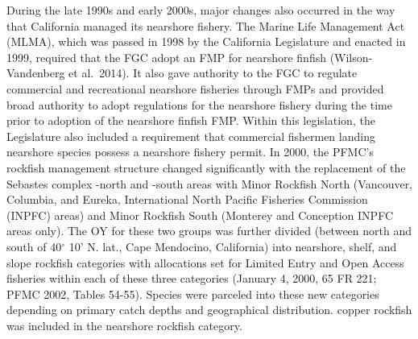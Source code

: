 \documentclass[11pt,
  english,
  letterpaper,
]{article}
\begin{document}
During the late 1990s and early 2000s, major changes also occurred in the way that California managed its nearshore fishery. The Marine Life Management Act (MLMA), which was passed in 1998 by the California Legislature and enacted in 1999, required that the FGC adopt an FMP for nearshore finfish (Wilson-Vandenberg et al.~2014). It also gave authority to the FGC to regulate commercial and recreational nearshore fisheries through FMPs and provided broad authority to adopt regulations for the nearshore fishery during the time prior to adoption of the nearshore finfish FMP. Within this legislation, the Legislature also included a requirement that commercial fishermen landing nearshore species possess a nearshore fishery permit. In 2000, the PFMC's rockfish management structure changed significantly with the replacement of the Sebastes complex -north and -south areas with Minor Rockfish North (Vancouver, Columbia, and Eureka, International North Pacific Fisheries Commission (INPFC) areas) and Minor Rockfish South (Monterey and Conception INPFC areas only). The OY for these two groups was further divided (between north and south of 40\(^\circ\) 10' N. lat., Cape Mendocino, California) into nearshore, shelf, and slope rockfish categories with allocations set for Limited Entry and Open Access fisheries within each of these three categories (January 4, 2000, 65 FR 221; PFMC 2002, Tables 54-55). Species were parceled into these new categories depending on primary catch depths and geographical distribution. copper rockfish was included in the nearshore rockfish category.
\end{document}

